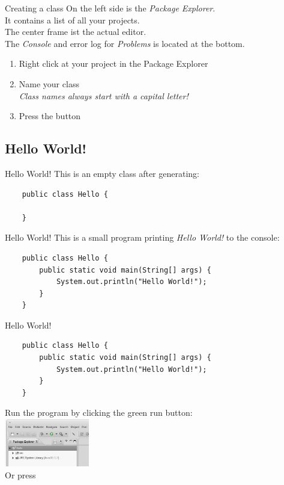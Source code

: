\begin{frame}{Creating a class}
	On the left side is the \emph{Package Explorer}. \\
	It contains a list of all your projects. \\
	The center frame ist the actual editor. \\
	The \emph{Console} and error log for \emph{Problems} is located at the bottom.
	\begin{enumerate}
		\item Right click at your project in the Package Explorer \hfill \\
		\item Name your class \\
			\emph{Class names always start with a capital letter!}
		\item Press the  button
	\end{enumerate}
\end{frame}

\subsection{Hello World!}

\begin{frame}[fragile]{Hello World!}
	This is an empty class after generating:
	\begin{lstlisting}
	public class Hello {
	
	}
	\end{lstlisting}
\end{frame}

\begin{frame}[fragile]{Hello World!}
	This is a small program printing \emph{Hello World!} to the console:
	\begin{lstlisting}
	public class Hello {
	    public static void main(String[] args) {
	        System.out.println("Hello World!");
	    }
	}
	\end{lstlisting}
\end{frame}

\begin{frame}[fragile]{Hello World!}
	\begin{lstlisting}
	public class Hello {
	    public static void main(String[] args) {
	        System.out.println("Hello World!");
	    }
	}
	\end{lstlisting}
	Run the program by clicking the green run button: \\
	\includegraphics[width=10em]{res/intro_run.png} \\
	Or press 
\end{frame}

